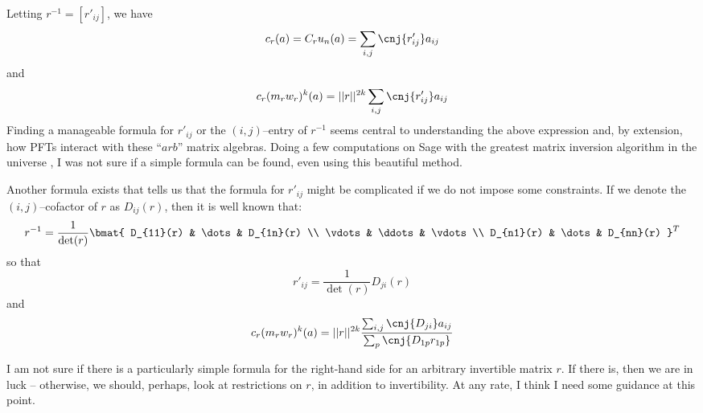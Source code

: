 \documentclass[./Thick_TQFTs_and_Quantum_Information.tex]{subfiles}
\begin{document}
Letting $r^{-1} = [r'_{ij}]$, we have
\[
  c_r(a) = C_ru_n(a) = \sum_{i, j} \cnj{r'_{ij}}a_{ij}
\]
and
\[
  c_r(m_rw_r)^k(a) = ||r||^{2k} \sum_{i, j} \cnj{r'_{ij}}a_{ij}
\]
Finding a manageable formula for $r'_{ij}$ or the $(i, j)$--entry of $r^{-1}$
seems central to understanding the above expression and, by extension, how PFTs
interact with these ``$arb$'' matrix algebras. Doing a few computations on Sage
with the greatest matrix inversion algorithm in the universe
\cite{SteveInvFormula}, I was not sure if a simple formula can be found, even
using this beautiful method.

Another formula exists that tells us that the formula for $r'_{ij}$ might be
complicated if we do not impose some constraints. If we denote the
$(i, j)$--cofactor of $r$ as $D_{ij}(r)$, then it is well known that:
\[
  r^{-1} = \frac{1}{\det(r)}\bmat{
    D_{11}(r) & \dots   & D_{1n}(r) \\
    \vdots    & \ddots  & \vdots \\
    D_{n1}(r) & \dots   & D_{nn}(r)
  }^{T}
\]
so that
\[
  r'_{ij} = \frac{1}{\det(r)}D_{ji}(r)
\]
and
\[
  c_r(m_rw_r)^k(a) = ||r||^{2k} \frac{
      \sum_{i, j} \cnj{D_{ji}}a_{ij}
    }{
      \sum_{p} \cnj{D_{1p}r_{1p}}
    }
\]

I am not sure if there is a particularly simple formula for the right-hand side
for an arbitrary invertible matrix $r$. If there is, then we are in luck --
otherwise, we should, perhaps, look at restrictions on $r$, in addition to
invertibility. At any rate, I think I need some guidance at this point.
\end{document}
